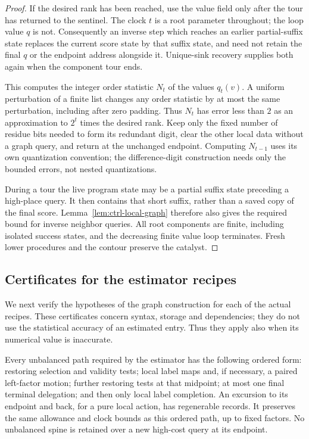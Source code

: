 \begin{proof}
If the desired rank has been reached, use the value field only after
the tour has returned to the sentinel.  The clock $t$ is a root
parameter throughout; the loop value $q$ is not.  Consequently an inverse
step which reaches an earlier partial-suffix state replaces the current
score state by that suffix state, and need not retain the final $q$ or
the endpoint address alongside it.  Unique-sink recovery supplies both
again when the component tour ends.

This computes the integer order statistic $N_t$ of the values $q_t(v)$.
A uniform
perturbation of a finite list changes any order statistic by at most
the same perturbation, including after zero padding.  Thus $N_t$ has
error less than $2$ as an approximation to $2^t$ times the desired rank.
Keep only the fixed number of residue bits needed to form its
redundant digit, clear the other local data without a graph query, and
return at the unchanged endpoint.  Computing $N_{t-1}$ uses its own
quantization convention; the difference-digit construction needs only
the bounded errors, not nested quantizations.

During a tour the live program state may be a partial suffix state
preceding a high-place query.  It then contains that short suffix,
rather than a saved copy of the final score.  Lemma~\ref{lem:ctrl-local-graph}
therefore also gives the required bound for inverse neighbor queries.
All root components are finite, including isolated success states, and
the decreasing finite value loop terminates.  Fresh lower procedures
and the contour preserve the catalyst.
\end{proof}

\subsection{Certificates for the estimator recipes}\label{sec:ctrl-recipes}

We next verify the hypotheses of the graph construction for each of the
actual recipes.  These certificates concern syntax, storage and
dependencies; they do not use the statistical accuracy of an estimated
entry.  Thus they apply also when its numerical value is inaccurate.

\begin{lemma}\label{lem:ctrl-paths}
Every unbalanced path required by the estimator has the following
ordered form: restoring selection and validity tests; local label maps
and, if necessary, a paired left-factor motion; further restoring tests
at that midpoint; at most one final terminal delegation; and then only
local label completion.  An excursion to its endpoint and back, for a
pure local action, has regenerable records.  It preserves the same
allowance and clock bounds as this ordered path, up to fixed factors.
No unbalanced spine is retained over a new high-cost query at its
endpoint.
\end{lemma}

